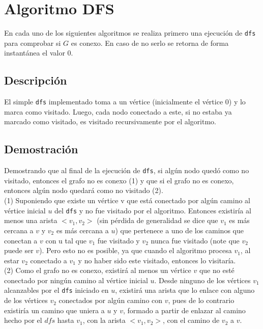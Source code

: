 \documentclass[a4paper,12pt,twocolumn]{article}
\begin{document}
   
  
  




\section{Algoritmo DFS}
En cada uno de los siguientes algoritmos se realiza primero una ejecución de \texttt{\ttfamily dfs} para comprobar si $G$ es conexo. En caso de no serlo se retorna de forma instantánea el valor 0.
\subsection{Descripción}
  El simple \texttt{\ttfamily dfs} implementado toma a un vértice  (inicialmente el vértice 0) y lo marca como visitado. Luego, cada nodo conectado a este, si no estaba ya marcado como visitado, es visitado recursivamente por el algoritmo.\\
  
  \subsection{Demostración}
Demostrando que al final de la ejecución de \texttt{\ttfamily dfs}, si algún nodo quedó como no visitado, entonces el grafo no es conexo (1) y que si el grafo no es conexo, entonces algún nodo quedará como no visitado (2).\\	
 (1) Suponiendo que existe un vértice v que está conectado por algún camino al vértice inicial $u$ del \texttt{\ttfamily dfs} y no fue visitado por el algoritmo. Entonces existiría al menos una arista $<v_1, v_2>$ (sin pérdida de generalidad se dice que $v_1$ es más cercana a $v$ y $v_2$ es más cercana a $u$) que pertenece a uno de los caminos que conectan a $v$ con u tal que $v_1$ fue visitado y $v_2$ nunca fue visitado (note que $v_2$ puede ser $v$). Pero esto no es posible, ya que cuando el algoritmo procesa $v_1$, al estar $v_2$ conectado a $v_1$ y no haber sido este visitado, entonces lo visitaría.\\
 (2) Como el grafo no es conexo, existirá al menos un vértice $v$ que no esté conectado por ningún camino al vértice inicial $u$. Desde ninguno de los vértices $v_1$ alcanzables por el \texttt{\ttfamily dfs} iniciado en $u$, existirá una arista que lo enlace con alguno de los vértices $v_2$ conectados por algún camino con $v$, pues de lo contrario existiría un camino que uniera a $u$ y $v$, formado a partir de enlazar al camino hecho por el $dfs$ hasta $v_1$, con la arista $<v_1, v_2>$, con el camino de $v_2$ a $v$.\\
 
\end{document}
